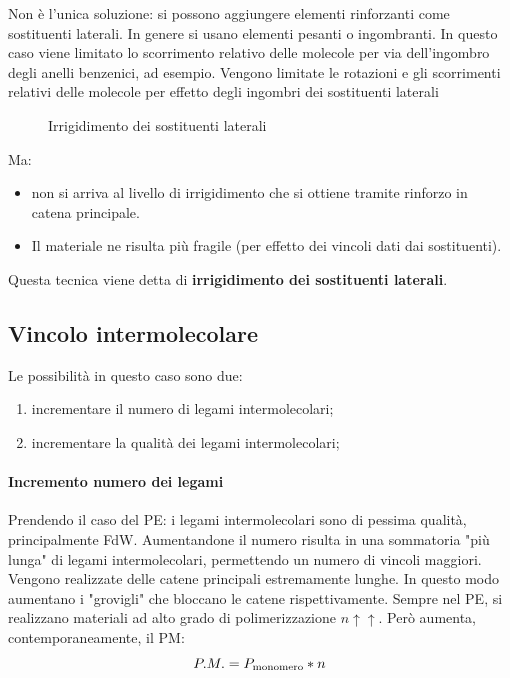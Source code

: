 Non è l'unica soluzione: si possono aggiungere elementi rinforzanti come sostituenti laterali. In genere si usano elementi pesanti o ingombranti.
In questo caso viene limitato lo scorrimento relativo delle molecole per via dell'ingombro degli anelli benzenici, ad esempio.
Vengono limitate le rotazioni e gli scorrimenti relativi delle molecole per effetto degli ingombri dei sostituenti laterali

\begin{figure}
\centering
{}
\caption{Irrigidimento dei sostituenti laterali}
\label{fig:IrrigidimentoLaterali}
\end{figure}

Ma:
\begin{itemize}
\item non si arriva al livello di irrigidimento che si ottiene tramite rinforzo in catena principale.
\item Il materiale ne risulta più fragile (per effetto dei vincoli dati dai sostituenti).
\end{itemize}
Questa tecnica viene detta di \textbf{irrigidimento dei sostituenti laterali}.

\subsection{Vincolo intermolecolare}
Le possibilità in questo caso sono due:
\begin{enumerate}
\item incrementare il numero di legami intermolecolari;
\item incrementare la qualità dei legami intermolecolari;
\end{enumerate}

\paragraph{Incremento numero dei legami}
Prendendo il caso del \ac{PE}: i legami intermolecolari sono di pessima qualità, principalmente \ac{FdW}. Aumentandone il numero risulta in una sommatoria "più lunga" di legami intermolecolari, permettendo un numero di vincoli maggiori.
Vengono realizzate delle catene principali estremamente lunghe.
In questo modo aumentano i "grovigli" che bloccano le catene rispettivamente.
Sempre nel \ac{PE}, si realizzano materiali ad alto grado di polimerizzazione $n \uparrow\uparrow$.
Però aumenta, contemporaneamente, il \ac{PM}:
\begin{equation}
P.M. = P_{\textup{monomero}} * n
\end{equation}

